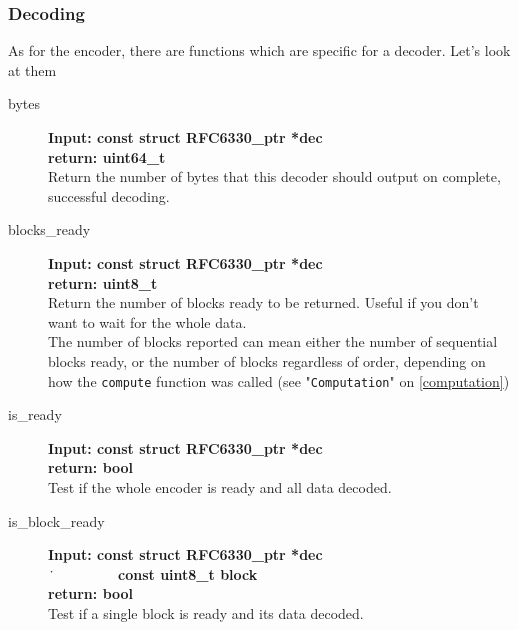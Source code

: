 \documentclass[11pt,a4paper]{refart}
\begin{document}
\newpage
\subsubsection{\textbf{Decoding}}
As for the encoder, there are functions which are specific for a decoder. Let's look at them

\begin{description}
\item[bytes]\textbf{Input: const struct RFC6330\_ptr *dec}\\
\textbf{return: uint64\_t}\\
Return the number of bytes that this decoder should output on complete, successful decoding.
\item[blocks\_ready]\textbf{Input: const struct RFC6330\_ptr *dec}\\
\textbf{return: uint8\_t}\\
Return the number of blocks ready to be returned. Useful if you don't want to wait for the whole data.\\
The number of blocks reported can mean either the number of sequential blocks ready, or the number
of blocks regardless of order, depending on how the \texttt{compute} function was called (see "\texttt{Computation}" on \ref{computation}) 
\item[is\_ready]\textbf{Input: const struct RFC6330\_ptr *dec}\\
\textbf{return: bool}\\
Test if the whole encoder is ready and all data decoded.
\item[is\_block\_ready]\textbf{Input: const struct RFC6330\_ptr *dec}\\
\.\ \ \ \ \ \ \ \ \ \ \textbf{const uint8\_t block}\\
\textbf{return: bool}\\
Test if a single block is ready and its data decoded.
\end{description}
\end{document}
